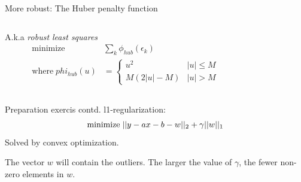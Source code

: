 \documentclass[presentation,aspectratio=169]{beamer}
\begin{document}
\begin{frame}[label=sec-2-6]{More robust: The Huber penalty function}
\begin{columns}
\begin{column}{0.4\textwidth}
A.k.a \emph{robust least squares}
\begin{align*}
 \text{minimize} \; &\sum_k \phi_{hub}(\epsilon_k)\\
 \text{where}\; phi_{hub}(u) &= \begin{cases} u^2 & |u| \le M\\ M(2|u|-M) & |u| > M \end{cases}
\end{align*}
\end{column}

\begin{column}{0.6\textwidth}
\begin{center}
\end{center}
\end{column}
\end{columns}
\end{frame}

\begin{frame}[label=sec-2-7]{Preparation exercis contd.}
l1-regularization:
\begin{equation*}
 \text{minimize} \; ||y - ax - b - w||_2 + \gamma ||w||_1\\
\end{equation*}
Solved by convex optimization.

The vector $w$ will contain the outliers. The larger the value of $\gamma$, the fewer non-zero elements in $w$. 
\end{frame}
\end{document}
